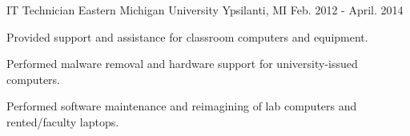 \begin{cventries}
\cventry
{IT Technician} %
{Eastern Michigan University} %
{Ypsilanti, MI} %
{Feb. 2012 - April. 2014} %
{ %
\begin{cvitems}
\item {Provided support and assistance for classroom computers and equipment.}
\item {Performed malware removal and hardware support for university-issued computers.}
\item {Performed software maintenance and reimagining of lab computers and rented/faculty laptops.}
\end{cvitems} 
}
\end{cventries}
\vspace{-5pt}
